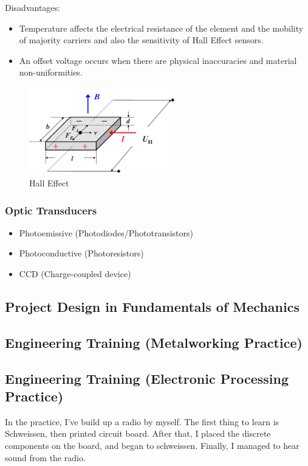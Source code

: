 Disadvantages:
\begin{itemize}
  \item Temperature affects the electrical resistance of the element and the mobility of majority carriers and also the sensitivity of Hall Effect sensors.
  \item An offset voltage occurs when there are physical inaccuracies and material non-uniformities.
\end{itemize}

\begin{figure}
  \centering
  \includegraphics[width=2.5in]{fig/fig_Hall.png}
  \caption{Hall Effect}\label{fig_hall}
\end{figure}

\subsubsection{Optic Transducers}
\begin{itemize}
  \item Photoemissive (Photodiodes/Phototransistors)
  \item Photoconductive (Photoresistors)
  \item CCD (Charge-coupled device)
\end{itemize}

\subsection{Project Design in Fundamentals of Mechanics}
\subsection{Engineering Training (Metalworking Practice)}
\subsection{Engineering Training (Electronic Processing Practice)}
In the practice, I've build up a radio by myself. The first thing to learn is Schweissen, then printed circuit board. After that, I placed the discrete components on the board, and began to schweissen. Finally, I managed to hear sound from the radio. 